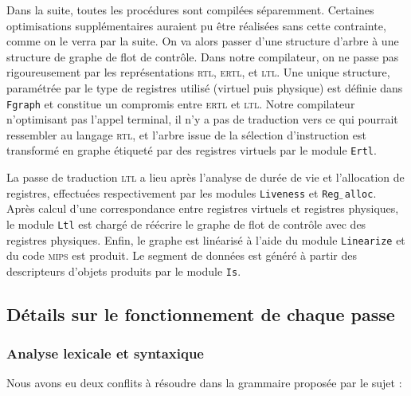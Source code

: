 \documentclass[11pt, a4paper]{article}
\newcommand{\prog}[1]{{\tt#1}}
\newcommand{\underscore}{$\_\,$}
\begin{document}
\medskip

Dans la suite, toutes les procédures sont compilées séparemment. Certaines optimisations supplémentaires auraient pu être réalisées sans cette contrainte, comme on le verra par la suite. On va alors passer d'une structure d'arbre à une structure de graphe de flot de contrôle. Dans notre compilateur, on ne passe pas rigoureusement par les représentations \textsc{rtl}, \textsc{ertl}, et \textsc{ltl}. Une unique structure, paramétrée par le type de registres utilisé (virtuel puis physique) est définie dans \prog{Fgraph} et constitue un compromis entre \textsc{ertl} et \textsc{ltl}. Notre compilateur n'optimisant pas l'appel terminal, il n'y a pas de traduction vers ce qui pourrait ressembler au langage \textsc{rtl}, et l'arbre issue de la sélection d'instruction est transformé en graphe étiqueté par des registres virtuels par le module \prog{Ertl}.

\medskip

La passe de traduction \textsc{ltl} a lieu après l'analyse de durée de vie et l'allocation de registres, effectuées respectivement par les modules \prog{Liveness} et \prog{Reg\underscore{}alloc}. Après calcul d'une correspondance entre registres virtuels et registres physiques, le module \prog{Ltl} est chargé de réécrire le graphe de flot de contrôle avec des registres physiques.  Enfin, le graphe est linéarisé à l'aide du module \prog{Linearize} et du code \textsc{mips} est produit. Le segment de données est généré à partir des descripteurs d'objets produits par le module \prog{Is}.

\subsection{Détails sur le fonctionnement de chaque passe}


\subsubsection{Analyse lexicale et syntaxique}

Nous avons eu deux conflits à résoudre dans la grammaire proposée par le sujet :
\end{document}
